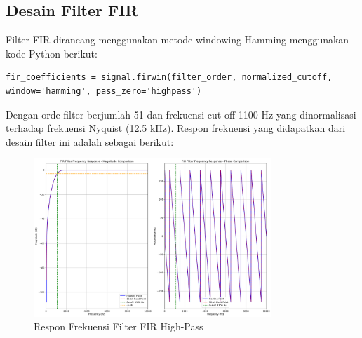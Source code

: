 \documentclass{article}
\begin{document}
\subsection{Desain Filter FIR}
Filter FIR dirancang menggunakan metode windowing Hamming menggunakan kode Python berikut:
\begin{lstlisting}[style=python]
fir_coefficients = signal.firwin(filter_order, normalized_cutoff, window='hamming', pass_zero='highpass')
\end{lstlisting}
Dengan orde filter berjumlah 51 dan frekuensi cut-off 1100 Hz yang dinormalisasi terhadap frekuensi Nyquist (12.5 kHz).
Respon frekuensi yang didapatkan dari desain filter ini adalah sebagai berikut:
\begin{figure}[H]
  \centering
  \includegraphics[width=0.8\textwidth]{fir_filter_response_16bit.png}
  \caption{Respon Frekuensi Filter FIR High-Pass}
  \label{fig:frequency_response}
\end{figure}
\end{document}
